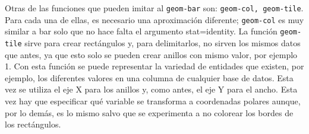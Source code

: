 \documentclass{article}\usepackage[]{graphicx}\usepackage[]{color}
\begin{document}
\clearpage
Otras de las funciones que pueden imitar al \texttt{geom-bar} son: \texttt{geom-col, geom-tile}. Para cada una de ellas, es necesario una aproximaci\'on diferente; \texttt{geom-col} es muy similar a bar solo que no hace falta el argumento stat=identity.
La funci\'on \texttt{geom-tile} sirve para crear rect\'angulos y, para delimitarlos, no sirven los mismos datos que antes, ya que esto solo se pueden crear anillos con mismo valor, por ejemplo 1. Con esta funci\'on se puede representar la variedad de entidades que existen, por ejemplo, los diferentes valores en una columna de cualquier base de datos. Esta vez se utiliza el eje X para los anillos y, como antes, el eje Y para el ancho. Esta vez hay que especificar qu\'e variable se transforma a coordenadas polares aunque, por lo dem\'as, es lo mismo salvo que se experimenta a no colorear los bordes de los rect\'angulos.
\end{document}
